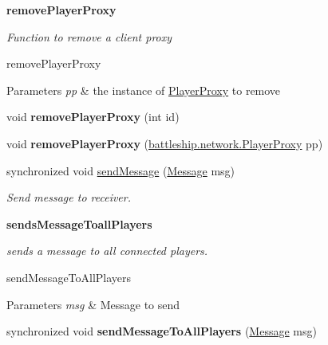 \begin{Indent}{\bf remove\+Player\+Proxy}\par
{\em Function to remove a client proxy

remove\+Player\+Proxy


\begin{DoxyParams}{Parameters}
{\em pp} & the instance of \hyperlink{classbattleship_1_1network_1_1PlayerProxy}{Player\+Proxy} to remove \\
\hline
\end{DoxyParams}
}\begin{DoxyCompactItemize}
\item 
\hypertarget{classbattleship_1_1network_1_1Server_a90a61668595ca6e8d6978954cd1e65f9}{}void {\bfseries remove\+Player\+Proxy} (int id)\label{classbattleship_1_1network_1_1Server_a90a61668595ca6e8d6978954cd1e65f9}

\item 
\hypertarget{classbattleship_1_1network_1_1Server_a65d8cc715530166518673b3910b845fa}{}void {\bfseries remove\+Player\+Proxy} (\hyperlink{classbattleship_1_1network_1_1PlayerProxy}{battleship.\+network.\+Player\+Proxy} pp)\label{classbattleship_1_1network_1_1Server_a65d8cc715530166518673b3910b845fa}

\item 
synchronized void \hyperlink{classbattleship_1_1network_1_1Server_a859ba33289507bcd49cce3455f2148c4}{send\+Message} (\hyperlink{classbattleship_1_1game_1_1Message}{Message} msg)
\begin{DoxyCompactList}\small\item\em Send message to receiver. \end{DoxyCompactList}\end{DoxyCompactItemize}
\end{Indent}
\begin{Indent}{\bf sends\+Message\+Toall\+Players}\par
{\em sends a message to all connected players.

send\+Message\+To\+All\+Players


\begin{DoxyParams}{Parameters}
{\em msg} & Message to send \\
\hline
\end{DoxyParams}
}\begin{DoxyCompactItemize}
\item 
\hypertarget{classbattleship_1_1network_1_1Server_ac4c47e47e69a1d1cb99f14a801088b4f}{}synchronized void {\bfseries send\+Message\+To\+All\+Players} (\hyperlink{classbattleship_1_1game_1_1Message}{Message} msg)\label{classbattleship_1_1network_1_1Server_ac4c47e47e69a1d1cb99f14a801088b4f}

\end{DoxyCompactItemize}
\end{Indent}
